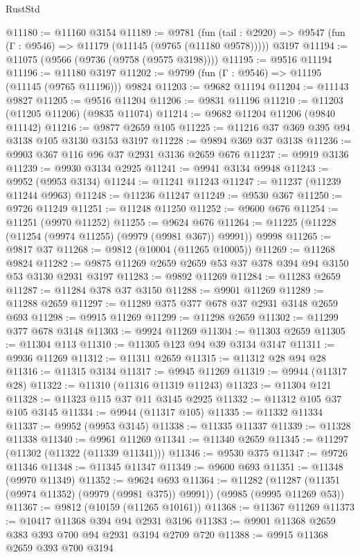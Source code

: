 \begin{lexlean}{RustStd}
\begin{coremodule}
@11180 := @11160 @3154
@11189 := @9781
    (fun (tail : @2920) => @9547 (fun (Γ : @9546) => @11179 (@11145 (@9765 (@11180 @9578)))))
    @3197
@11194 := @11075 (@9566 (@9736 (@9758 (@9575 @3198))))
@11195 := @9516 @11194
@11196 := @11180 @3197
@11202 := @9799 (fun (Γ : @9546) => @11195 (@11145 (@9765 @11196))) @9824
@11203 := @9682 @11194
@11204 := @11143 @9827
@11205 := @9516 @11204
@11206 := @9831 @11196
@11210 := @11203 (@11205 @11206) (@9835 @11074)
@11214 := @9682 @11204 @11206 (@9840 @11142)
@11216 := @9877 @2659 @105
@11225 := @11216 @37 @369 @395 @94 @3138 @105 @3130 @3153 @3197
@11228 := @9894 @369 @37 @3138
@11236 := @9903 @367 @116 @96 @37 @2931 @3136 @2659 @676
@11237 := @9919 @3136
@11239 := @9930 @3134 @2925
@11241 := @9941 @3134 @9948
@11243 := @9952 (@9953 @3134)
@11244 := @11241 @11243
@11247 := @11237 (@11239 @11244 @9963)
@11248 := @11236 @11247
@11249 := @9530 @367
@11250 := @9726 @11249
@11251 := @11248 @11250
@11252 := @9600 @676
@11254 := @11251 (@9970 @11252)
@11255 := @9624 @676
@11264 := @11225 (@11228 (@11254 (@9974 @11255) (@9979 (@9981 @367)) @9991)) @9998
@11265 := @9817 @37
@11268 := @9812 (@10004 (@11265 @10005))
@11269 := @11268 @9824
@11282 := @9875 @11269 @2659 @2659 @53 @37 @378 @394 @94 @3150 @53 @3130 @2931 @3197
@11283 := @9892 @11269
@11284 := @11283 @2659
@11287 := @11284 @378 @37 @3150
@11288 := @9901 @11269
@11289 := @11288 @2659
@11297 := @11289 @375 @377 @678 @37 @2931 @3148 @2659 @693
@11298 := @9915 @11269
@11299 := @11298 @2659
@11302 := @11299 @377 @678 @3148
@11303 := @9924 @11269
@11304 := @11303 @2659
@11305 := @11304 @113
@11310 := @11305 @123 @94 @39 @3134 @3147
@11311 := @9936 @11269
@11312 := @11311 @2659
@11315 := @11312 @28 @94 @28
@11316 := @11315 @3134
@11317 := @9945 @11269
@11319 := @9944 (@11317 @28)
@11322 := @11310 (@11316 @11319 @11243)
@11323 := @11304 @121
@11328 := @11323 @115 @37 @11 @3145 @2925
@11332 := @11312 @105 @37 @105 @3145
@11334 := @9944 (@11317 @105)
@11335 := @11332 @11334
@11337 := @9952 (@9953 @3145)
@11338 := @11335 @11337
@11339 := @11328 @11338
@11340 := @9961 @11269
@11341 := @11340 @2659
@11345 := @11297 (@11302 (@11322 (@11339 @11341)))
@11346 := @9530 @375
@11347 := @9726 @11346
@11348 := @11345 @11347
@11349 := @9600 @693
@11351 := @11348 (@9970 @11349)
@11352 := @9624 @693
@11364 := @11282
    (@11287 (@11351 (@9974 @11352) (@9979 (@9981 @375)) @9991))
    (@9985 (@9995 @11269 @53))
@11367 := @9812 (@10159 (@11265 @10161))
@11368 := @11367 @11269
@11373 := @10417 @11368 @394 @94 @2931 @3196
@11383 := @9901 @11368 @2659 @383 @393 @700 @94 @2931 @3194 @2709 @720
@11388 := @9915 @11368 @2659 @393 @700 @3194

\end{coremodule}
\end{lexlean}
